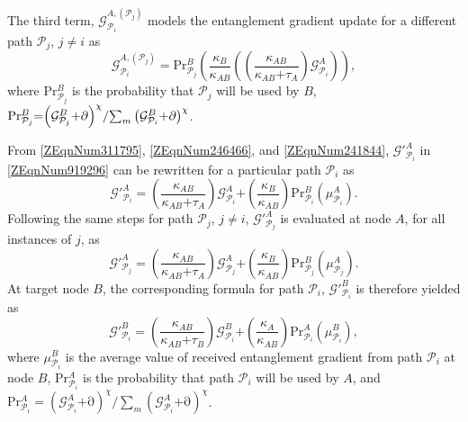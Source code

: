 \documentclass[11pt]{article}%
\begin{document}
 The third term, ${\mathcal{G}}^{A,\left({\mathcal{P}}_j\right)}_{{\mathcal{P}}_i}$ models the entanglement gradient update for a different path ${\mathcal{P}}_j$, $j\mathrm{\ne }i$ as
\begin{equation} \label{ZEqnNum241844} 
{\mathcal{G}}^{A,\left({\mathcal{P}}_j\right)}_{{\mathcal{P}}_i}\mathrm{=P}{\mathrm{r}}^B_{{\mathcal{P}}_j}\left(\frac{{\kappa }_B}{{\kappa }_{AB}}\left(\left(\frac{{\kappa }_{AB}}{{\kappa }_{AB}\mathrm{+}{\tau }_A}\right){\mathcal{G}}^A_{{\mathcal{P}}_i}\right)\right),                                                                 
\end{equation} 
where $\mathrm{P}{\mathrm{r}}^B_{{\mathcal{P}}_j}$ is the probability that ${\mathcal{P}}_j$ will be used by $B$, $\mathrm{P}{\mathrm{r}}^B_{{\mathcal{P}}_j}\mathrm{=}{{\left({\mathcal{G}}^B_{{\mathcal{P}}_j}\mathrm{+}\mathrm{\partial }\right)}^{\chi }}/\\{{\sum_m{\left({\mathcal{G}}^B_{{\mathcal{P}}_i}\mathrm{+}\mathrm{\partial }\right)}}^{\chi }}$. 

 From \eqref{ZEqnNum311795}, \eqref{ZEqnNum246466}, and \eqref{ZEqnNum241844}, ${\mathcal{G}}'^A_{{\mathcal{P}}_i}$ in \eqref{ZEqnNum919296} can be rewritten for a particular path ${\mathcal{P}}_i$ as
\begin{equation} \label{ZEqnNum937895} 
{\mathcal{G}}'^A_{{\mathcal{P}}_i}\mathrm{=}\left(\frac{{\kappa }_{AB}}{{\kappa }_{AB}\mathrm{+}{\tau }_A}\right){\mathcal{G}}^A_{{\mathcal{P}}_i}\mathrm{+}\left(\frac{{\kappa }_B}{{\kappa }_{AB}}\right)\mathrm{P}{\mathrm{r}}^B_{{\mathcal{P}}_i}\left({\mu }^A_{{\mathcal{P}}_i}\right). 
\end{equation} 
Following the same steps for path ${\mathcal{P}}_j$, $j\mathrm{\ne }i$, ${\mathcal{G}}'^A_{{\mathcal{P}}_j}$ is evaluated at node $A$, for all instances of $j$, as
\begin{equation} \label{ZEqnNum364941} 
{\mathcal{G}}'^A_{{\mathcal{P}}_j}\mathrm{=}\left(\frac{{\kappa }_{AB}}{{\kappa }_{AB}\mathrm{+}{\tau }_A}\right){\mathcal{G}}^A_{{\mathcal{P}}_j}\mathrm{+}\left(\frac{{\kappa }_B}{{\kappa }_{AB}}\right)\mathrm{P}{\mathrm{r}}^B_{{\mathcal{P}}_j}\left({\mu }^A_{{\mathcal{P}}_j}\right). 
\end{equation} 
At target node $B$, the corresponding formula for path ${\mathcal{P}}_i$, ${\mathcal{G}}'^B_{{\mathcal{P}}_i}$ is therefore yielded as
\begin{equation} \label{21)} 
{\mathcal{G}}'^B_{{\mathcal{P}}_i}\mathrm{=}\left(\frac{{\kappa }_{AB}}{{\kappa }_{AB}\mathrm{+}{\tau }_B}\right){\mathcal{G}}^B_{{\mathcal{P}}_i}\mathrm{+}\left(\frac{{\kappa }_A}{{\kappa }_{AB}}\right)\mathrm{P}{\mathrm{r}}^A_{{\mathcal{P}}_i}\left({\mu }^B_{{\mathcal{P}}_i}\right), 
\end{equation} 
where ${\mu }^B_{{\mathcal{P}}_i}$ is the average value of received entanglement gradient from path ${\mathcal{P}}_i$ at node $B$, $\mathrm{P}{\mathrm{r}}^A_{{\mathcal{P}}_i}$ is the probability that path ${\mathcal{P}}_i$ will be used by $A$, and $\mathrm{P}{\mathrm{r}}^A_{{\mathcal{P}}_i}\mathrm{=}{{\left({\mathcal{G}}^A_{{\mathcal{P}}_i}\mathrm{+}\mathrm{\partial }\right)}^{\chi }}/{{\sum_m{\left({\mathcal{G}}^A_{{\mathcal{P}}_i}\mathrm{+}\mathrm{\partial }\right)}}^{\chi }}$. 
\end{document}
